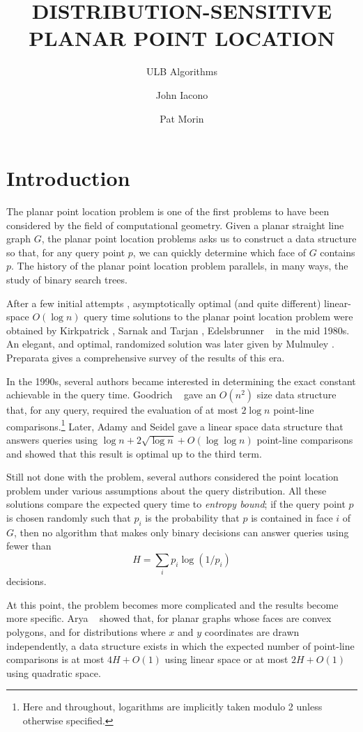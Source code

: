 \documentclass[charterfonts,lotsofwhite]{patmorin}
\title{\MakeUppercase{Distribution-Sensitive Planar Point Location}}
\author{ULB Algorithms \and John Iacono \and Pat Morin}
\date{}
\begin{document}
\maketitle

\section{Introduction}

The planar point location problem is one of the first problems to have
been considered by the field of computational geometry. Given a planar
straight line graph $G$, the planar point location problems asks us to
construct a data structure so that, for any query point $p$, we can
quickly determine which face of $G$ contains $p$.  The history of the
planar point location problem parallels, in many ways, the study of
binary search trees.

After a few initial attempts \cite{dl76,lp77,p81}, asymptotically
optimal (and quite different) linear-space $O(\log n)$ query time
solutions to the planar point location problem were obtained by
Kirkpatrick \cite{28}, Sarnak and Tarjan \cite{46}, Edelsbrunner
\etal\ \cite{24} in the mid 1980s.  An elegant, and optimal,
randomized solution was later given by Mulmuley \cite{34}.  Preparata
\cite{p} gives a comprehensive survey of the results of this era.

In the 1990s, several authors became interested in determining the
exact constant achievable in the query time.  Goodrich \etal\
\cite{26} gave an $O(n^2)$ size data structure that, for any query,
required the evaluation of at most $2\log n$ point-line
comparisons.\footnote{Here and throughout, logarithms are implicitly
taken modulo 2 unless otherwise specified.} Later, Adamy and Seidel
\cite{1} gave a linear space data structure that answers queries using
$\log n + 2\sqrt{\log n} + O(\log\log n)$ point-line comparisons and
showed that this result is optimal up to the third term.

Still not done with the problem, several authors considered the point
location problem under various assumptions about the query
distribution.  All these solutions compare the expected query time to
\emph{entropy bound};  if the query point $p$ is chosen randomly such
that $p_i$ is the probability that $p$ is contained in face $i$ of
$G$, then no algorithm that makes only binary decisions can answer
queries using fewer than 
\[
    H = \sum_i p_i\log(1/p_i)
\]
decisions.

At this point, the problem becomes more complicated and the results
become more specific.  Arya \etal\ \cite{XXX} showed that, for planar
graphs whose faces are convex polygons, and for distributions where
$x$ and $y$ coordinates are drawn independently, a data structure
exists in which the expected number of point-line comparisons is at
most $4H+O(1)$ using linear space or at most $2H+O(1)$ using quadratic
space.
\end{document}
